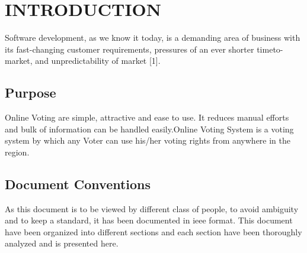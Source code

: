 \documentclass[12pt,a4paper,oneside]{report}
\renewcommand{\footrulewidth}{1.2pt}
\renewcommand{\headrulewidth}{1.2pt}
\begin{document}
\tableofcontents
\renewcommand*\thesection{\thechapter.\arabic{section}}
\newpage
{}
\setcounter{page}{1}
\pagestyle{fancy}
\headheight 26pt
\renewcommand{\footrulewidth}{1.2pt}
\renewcommand{\headrulewidth}{1.2pt}
\rhead{\scriptsize {\leftmark}}
\rfoot{\thepage}
\cfoot{\empty}
   

\chapter{INTRODUCTION}
\setcounter{page}{1}
Software development, as we know it today, is a demanding area of business
with its fast-changing customer requirements, pressures of an ever shorter timeto-
market, and unpredictability of market [1]. 


\section{Purpose}
Online Voting are simple, attractive and ease to use. It reduces manual efforts and bulk of information can be handled easily.Online Voting System is a voting system by which any Voter can use his/her voting rights from anywhere in the region.
\newpage
\section{Document Conventions}
As this document is to be viewed by different class of people, to avoid ambiguity and to keep a standard, it has been documented in ieee format. This document have been organized into different sections and each section have been thoroughly analyzed and is presented here. 
\end{document}
